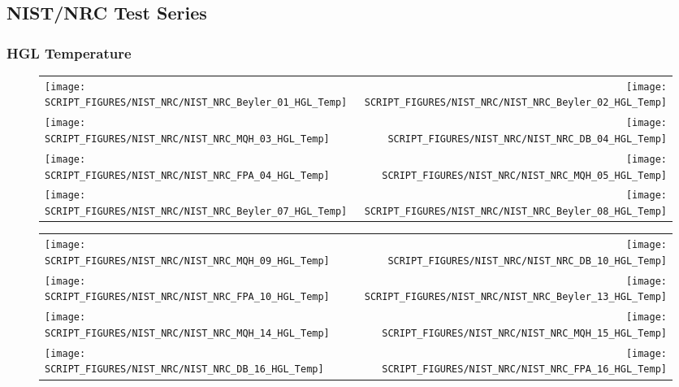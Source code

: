 \clearpage

\subsection{NIST/NRC Test Series}

\subsubsection{HGL Temperature}

\begin{figure}[p]
\begin{tabular*}{\textwidth}{l@{\extracolsep{\fill}}r}
\texttt{[image: SCRIPT\_FIGURES/NIST\_NRC/NIST\_NRC\_Beyler\_01\_HGL\_Temp]} &
\texttt{[image: SCRIPT\_FIGURES/NIST\_NRC/NIST\_NRC\_Beyler\_02\_HGL\_Temp]} \\
\texttt{[image: SCRIPT\_FIGURES/NIST\_NRC/NIST\_NRC\_MQH\_03\_HGL\_Temp]} &
\texttt{[image: SCRIPT\_FIGURES/NIST\_NRC/NIST\_NRC\_DB\_04\_HGL\_Temp]} \\
\texttt{[image: SCRIPT\_FIGURES/NIST\_NRC/NIST\_NRC\_FPA\_04\_HGL\_Temp]} &
\texttt{[image: SCRIPT\_FIGURES/NIST\_NRC/NIST\_NRC\_MQH\_05\_HGL\_Temp]} \\
\texttt{[image: SCRIPT\_FIGURES/NIST\_NRC/NIST\_NRC\_Beyler\_07\_HGL\_Temp]} &
\texttt{[image: SCRIPT\_FIGURES/NIST\_NRC/NIST\_NRC\_Beyler\_08\_HGL\_Temp]}
\end{tabular*}
\end{figure}

\begin{figure}[p]
\begin{tabular*}{\textwidth}{l@{\extracolsep{\fill}}r}
\texttt{[image: SCRIPT\_FIGURES/NIST\_NRC/NIST\_NRC\_MQH\_09\_HGL\_Temp]} &
\texttt{[image: SCRIPT\_FIGURES/NIST\_NRC/NIST\_NRC\_DB\_10\_HGL\_Temp]} \\
\texttt{[image: SCRIPT\_FIGURES/NIST\_NRC/NIST\_NRC\_FPA\_10\_HGL\_Temp]} &
\texttt{[image: SCRIPT\_FIGURES/NIST\_NRC/NIST\_NRC\_Beyler\_13\_HGL\_Temp]} \\
\texttt{[image: SCRIPT\_FIGURES/NIST\_NRC/NIST\_NRC\_MQH\_14\_HGL\_Temp]} &
\texttt{[image: SCRIPT\_FIGURES/NIST\_NRC/NIST\_NRC\_MQH\_15\_HGL\_Temp]} \\
\texttt{[image: SCRIPT\_FIGURES/NIST\_NRC/NIST\_NRC\_DB\_16\_HGL\_Temp]} &
\texttt{[image: SCRIPT\_FIGURES/NIST\_NRC/NIST\_NRC\_FPA\_16\_HGL\_Temp]}
\end{tabular*}
\end{figure}

